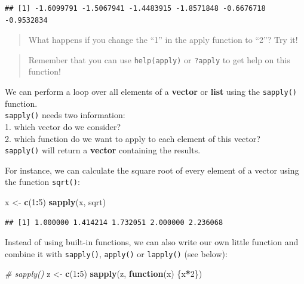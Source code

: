 \documentclass[
]{book}
\newenvironment{Shaded}{\begin{snugshade}}{\end{snugshade}}
\newcommand{\CommentTok}[1]{\textcolor[rgb]{0.56,0.35,0.01}{\textit{#1}}}
\newcommand{\ControlFlowTok}[1]{\textcolor[rgb]{0.13,0.29,0.53}{\textbf{#1}}}
\newcommand{\DecValTok}[1]{\textcolor[rgb]{0.00,0.00,0.81}{#1}}
\newcommand{\FunctionTok}[1]{\textcolor[rgb]{0.13,0.29,0.53}{\textbf{#1}}}
\newcommand{\NormalTok}[1]{#1}
\newcommand{\OtherTok}[1]{\textcolor[rgb]{0.56,0.35,0.01}{#1}}
\newcommand{\SpecialCharTok}[1]{\textcolor[rgb]{0.81,0.36,0.00}{\textbf{#1}}}
\begin{document}
\begin{verbatim}
## [1] -1.6099791 -1.5067941 -1.4483915 -1.8571848 -0.6676718 -0.9532834
\end{verbatim}

\begin{quote}
What happens if you change the ``1'' in the apply function to ``2''?
Try it!
\end{quote}

\begin{quote}
Remember that you can use \texttt{help(apply)} or \texttt{?apply} to get help on this function!
\end{quote}

We can perform a loop over all elements of a \textbf{vector} or \textbf{list} using the \texttt{sapply()} function.\\
\texttt{sapply()} needs two information:\\
1.
which vector do we consider?\\
2.
which function do we want to apply to each element of this vector?\\
\texttt{sapply()} will return a \textbf{vector} containing the results.

For instance, we can calculate the square root of every element of a vector using the function \texttt{sqrt()}:

\begin{Shaded}
\begin{Highlighting}[]
\NormalTok{x }\OtherTok{\textless{}{-}} \FunctionTok{c}\NormalTok{(}\DecValTok{1}\SpecialCharTok{:}\DecValTok{5}\NormalTok{)}
\FunctionTok{sapply}\NormalTok{(x, sqrt)}
\end{Highlighting}
\end{Shaded}

\begin{verbatim}
## [1] 1.000000 1.414214 1.732051 2.000000 2.236068
\end{verbatim}

Instead of using built-in functions, we can also write our own little function and combine it with \texttt{sapply()}, \texttt{apply()} or \texttt{lapply()} (see below):

\begin{Shaded}
\begin{Highlighting}[]
\CommentTok{\# sapply()}
\NormalTok{z }\OtherTok{\textless{}{-}} \FunctionTok{c}\NormalTok{(}\DecValTok{1}\SpecialCharTok{:}\DecValTok{5}\NormalTok{)}
\FunctionTok{sapply}\NormalTok{(z, }\ControlFlowTok{function}\NormalTok{(x) \{x}\SpecialCharTok{*}\DecValTok{2}\NormalTok{\}) }
\end{Highlighting}
\end{Shaded}
\end{document}
